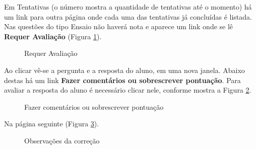 Em Tentativas (o número mostra a quantidade de tentativas até o momento) há um link para outra página onde cada uma das tentativas já concluídas é listada. Nas questões do tipo Ensaio não haverá nota e aparece um link onde se lê \textbf{Requer Avaliação} (Figura \ref{fig:cap5_25}).

\begin{figure}[htbp]
 \begin{center}
  \caption{Requer Avaliação}
  \label{fig:cap5_25}
 \end{center}
\end{figure}

Ao clicar vê-se a pergunta e a resposta do aluno, em uma nova janela. Abaixo destas há um link \textbf{Fazer comentários ou sobrescrever pontuação}. Para avaliar a resposta do aluno é necessário clicar nele, conforme mostra a Figura \ref{fig:cap5_26}.

\begin{figure}[htbp]
 \begin{center}
  \caption{Fazer comentários ou sobrescrever pontuação}
  \label{fig:cap5_26}
 \end{center}
\end{figure}

Na página seguinte (Figura \ref{fig:cap5_27}).
\begin{figure}[htbp]
 \begin{center}
  \caption{Observações da correção}
  \label{fig:cap5_27}
 \end{center}
\end{figure}

